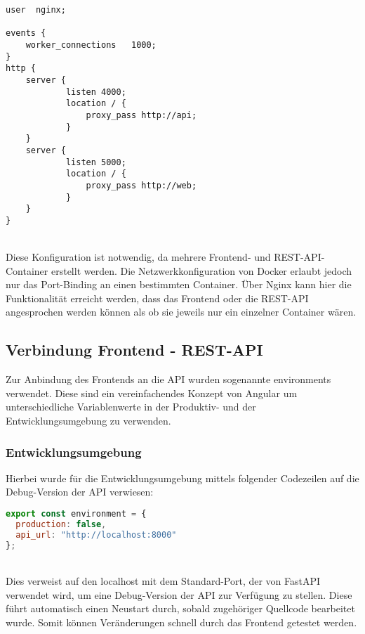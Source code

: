 \begin{lstlisting}[language={}, caption={Load-Balancer Nginx Konfiguration}, captionpos=b, label={fig:Load Balancer Nginx}]
user  nginx;

events {
    worker_connections   1000;
}
http {
    server {
            listen 4000;
            location / {
                proxy_pass http://api;
            }
    }
    server {
            listen 5000;
            location / {
                proxy_pass http://web;
            }
    }
}
\end{lstlisting}
~\\Diese Konfiguration ist notwendig, da mehrere Frontend- und REST-API-Container erstellt werden. 
Die Netzwerkkonfiguration von Docker erlaubt jedoch nur das Port-Binding an einen bestimmten Container. 
Über Nginx kann hier die Funktionalität erreicht werden, dass das Frontend oder die REST-API angesprochen werden können als ob sie jeweils nur ein einzelner Container wären.

\subsection{Verbindung Frontend - REST-API}
Zur Anbindung des Frontends an die API wurden sogenannte environments \cite{angular-environments} verwendet. 
Diese sind ein vereinfachendes Konzept von Angular \cite{angular} um unterschiedliche Variablenwerte in der Produktiv- und der Entwicklungsumgebung zu verwenden.
\subsubsection{Entwicklungsumgebung}
Hierbei wurde für die Entwicklungsumgebung mittels folgender Codezeilen auf die Debug-Version der API verwiesen: 


\begin{lstlisting}[language={JavaScript}, caption={Entwicklungsvariablen}, captionpos=b, label={fig:environment dev}]
export const environment = {
  production: false,
  api_url: "http://localhost:8000"
};
\end{lstlisting}
~\\Dies verweist auf den localhost mit dem Standard-Port, der von FastAPI \cite{fastapi} verwendet wird, um eine Debug-Version der API zur Verfügung zu stellen. Diese führt automatisch einen Neustart durch, sobald zugehöriger Quellcode bearbeitet wurde. Somit können Veränderungen schnell durch das Frontend getestet werden. 

